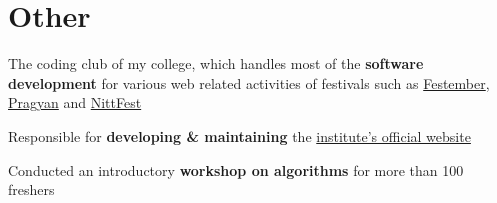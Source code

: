 \documentclass[]{deedy-resume-openfont}
\begin{document}
\begin{minipage}[t]{0.69\textwidth}
\section{Other}
\begin{tightemize}
\item The coding club of my college, which handles most of the \textbf{software development} for various web related activities of festivals such as \href{https://festember.com}{Festember}, \href{https://www.pragyan.org}{Pragyan} and \href{https://www.nittfest.in/}{NittFest} \item Responsible for \textbf{developing \& maintaining} the \href{https://www.nitt.edu/}{institute's official website} \item Conducted an introductory \textbf{workshop on algorithms} for more than 100 freshers
\end{tightemize}
\sectionsep

\end{minipage}
\end{document}
